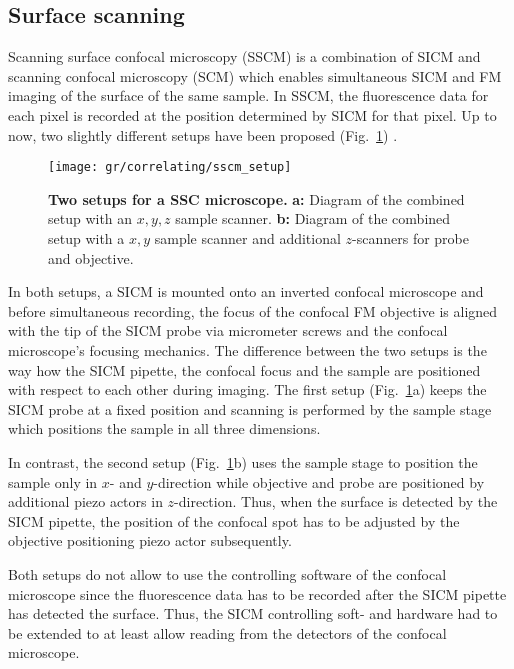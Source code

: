 \subsection{Surface scanning}

Scanning surface confocal microscopy (SSCM) \cite{Gorelik2002a} is a
combination of SICM and scanning confocal microscopy (SCM) which enables
simultaneous SICM and FM imaging of the surface of the same sample. In SSCM,
the fluorescence data for each pixel is recorded at the position determined by
SICM for that pixel. Up to now, two slightly different setups have been proposed
(Fig.~\ref{fig:sscm_setup}) \cite{Gorelik2002a,Shevchuk2013}.

\begin{figure}
  \centering
  \texttt{[image: gr/correlating/sscm\_setup]}

  \caption{%
    \textbf{Two setups for a SSC microscope.}
    \textbf{a:} Diagram of the combined setup with an $x,y,z$ sample scanner.
    \textbf{b:} Diagram of the combined setup with a $x,y$ sample scanner and
    additional $z$-scanners for probe and objective. 
  }
  \label{fig:sscm_setup}
\end{figure}

In both setups, a SICM is mounted onto an inverted confocal microscope and
before simultaneous recording, the focus of the confocal FM objective is
aligned with the tip of the SICM probe via micrometer screws and the confocal
microscope's focusing mechanics. The
difference between the two setups is the way how the SICM pipette, the
confocal focus and the sample are positioned with respect to each other during
imaging. The
first setup (Fig.~\ref{fig:sscm_setup}a) keeps the 
SICM probe at a fixed position and scanning is performed by the sample
stage which positions the sample in all three dimensions.

In contrast, the second setup (Fig.~\ref{fig:sscm_setup}b) uses the sample
stage to position the sample only in $x$- and $y$-direction while objective
and probe are positioned by additional piezo actors in $z$-direction. Thus,
when the surface is detected by the SICM pipette, the position of the confocal
spot has to be adjusted by the objective positioning piezo actor subsequently.

Both setups do not allow to use the controlling software of the confocal
microscope since the fluorescence data has to be recorded after the SICM
pipette has detected the surface. Thus, the SICM controlling soft- and
hardware had to be extended to at least allow reading from the detectors of
the confocal microscope. 

